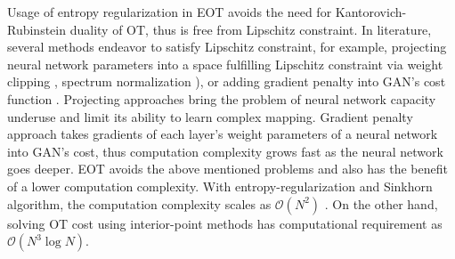 Usage of entropy regularization in EOT avoids the need for Kantorovich-Rubinstein duality
of OT, thus is free from Lipschitz constraint. In literature, several methods endeavor to
satisfy Lipschitz constraint, for example, projecting neural network
parameters into a space fulfilling Lipschitz constraint via weight
clipping \cite{2017arXiv170107875A}, spectrum
normalization \cite{2018arXiv180205957M}), or adding gradient 
penalty into GAN's cost function \cite{2017arXiv170400028G}. Projecting
approaches bring the problem of neural network capacity underuse and
limit its ability to learn complex mapping. Gradient penalty approach takes
gradients of each layer's weight parameters of a neural network into
GAN's cost, thus computation complexity grows fast as the neural
network goes deeper. 
EOT avoids the above mentioned problems and also has the benefit of a lower
computation complexity. With entropy-regularization and Sinkhorn
algorithm, the computation complexity scales as $\mathcal{O}(N^2)$ \cite{2013arXiv1306.0895C}. 
On the other hand, solving OT cost using interior-point methods has computational requirement as 
$\mathcal{O}(N^3\log{N})$. 






